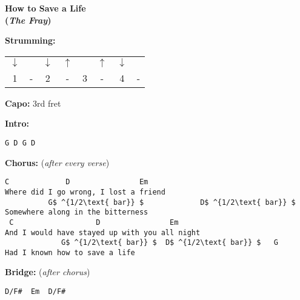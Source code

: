 \clearpage

\begin{minipage}[t]{0.49\textwidth}
	{\Large \textbf{How to Save a Life}}\\[1ex]
	{\large \textbf{(\emph{The Fray})}}

	\bigskip


	\bigskip

	\textbf{Strumming:}\\[1ex]
	\begin{tabular}{@{} c@{}c c@{}c c@{}c c@{}c @{}}
		$ \downarrow $ & & $ \downarrow $&  $ \uparrow $& & $ \uparrow $& $ \downarrow $ & \\
		1 & - & 2 & -& 3 & -& 4& -\\
	\end{tabular}

	\bigskip

	\textbf{Capo:} 3rd fret

\bigskip
\bigskip

\textbf{Intro:}
\begin{lstlisting}[mathescape=true]
G D G D
\end{lstlisting}
\bigskip
\textbf{Chorus:} (\emph{after every verse})
\begin{lstlisting}[mathescape=true]
  C             D                Em
Where did I go wrong, I lost a friend
          G$ ^{1/2\text{ bar}} $             D$ ^{1/2\text{ bar}} $
Somewhere along in the bitterness
 C                   D                Em
And I would have stayed up with you all night
             G$ ^{1/2\text{ bar}} $  D$ ^{1/2\text{ bar}} $   G
Had I known how to save a life
\end{lstlisting}
\bigskip
\textbf{Bridge:} (\emph{after chorus})
\begin{lstlisting}[mathescape=true]
D/F#  Em  D/F#
\end{lstlisting}

\end{minipage}\hfill%
